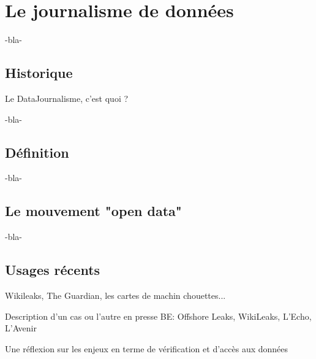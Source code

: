 
\chapter{Le journalisme de données}


-bla-

\section{Historique}

Le DataJournalisme, c'est quoi ?

-bla-

\section{Définition}

-bla-

\section{Le mouvement "open data"}

-bla-

\section{Usages récents}

Wikileaks, The Guardian, les cartes de machin chouettes...


Description d'un cas ou l'autre en presse BE: Offshore Leaks, WikiLeaks, L'Echo, L'Avenir

Une réflexion sur les enjeux en terme de vérification et d'accès aux données

